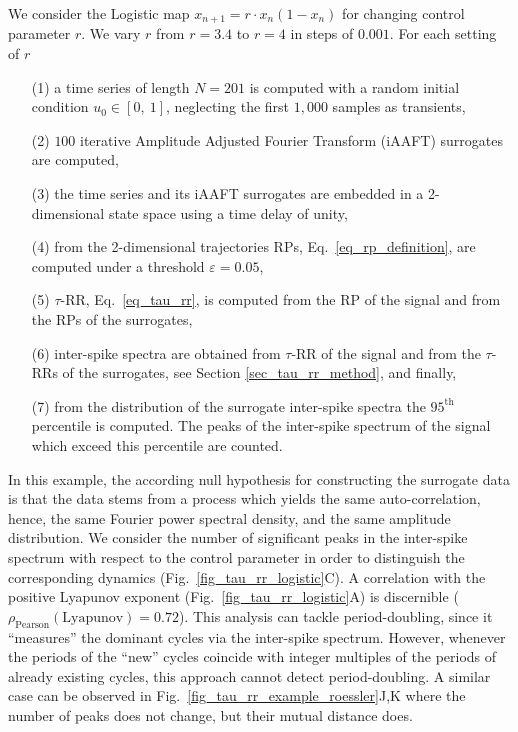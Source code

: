 \documentclass[entropy,article,submit,pdftex,moreauthors]{Definitions/mdpi}
\begin{document}
We consider the Logistic map $x_{n+1}=r\cdot x_n \left( 1-x_n \right)$ for changing control parameter $r$. We vary $r$ from $r=3.4$ to $r=4$ in steps of $0.001$. For 
each setting of $r$ 
\begin{itemize}[noitemsep]
\item[(1)] a time series of length $N=201$ is computed with a random initial condition $u_0 \in [0,\ 1]$, neglecting the first $1,000$ samples as transients,
\item[(2)] $100$ iterative Amplitude Adjusted Fourier Transform (iAAFT) surrogates \cite{Schreiber1996,Schreiber2000} are computed,
\item[(3)] the time series and its iAAFT surrogates are embedded in a 2-dimensional state space using a time delay of unity,
\item[(4)] from the 2-dimensional trajectories RPs, Eq.~\eqref{eq_rp_definition}, are computed under a threshold $\varepsilon=0.05$,
\item[(5)] $\tau$-RR, Eq.~\eqref{eq_tau_rr}, is computed from the RP of the signal and from the RPs of the surrogates,
\item[(6)] inter-spike spectra are obtained from $\tau$-RR of the signal and from the $\tau$-RRs of the surrogates, see Section \ref{sec_tau_rr_method}, and finally,
\item[(7)] from the distribution of the surrogate inter-spike spectra the $95^\text{th}$ percentile is computed. The peaks of the inter-spike spectrum of the signal which exceed 
this percentile are counted. 
\end{itemize}
In this example, the according null hypothesis for constructing the surrogate data is that the data stems from a process which yields the same auto-correlation, 
hence, the same Fourier power spectral density, and the same 
amplitude distribution. We consider the number of significant peaks in the inter-spike spectrum with
respect to the control parameter in order to distinguish the corresponding dynamics (Fig.~\ref{fig_tau_rr_logistic}C).
A correlation with the positive Lyapunov exponent (Fig.~\ref{fig_tau_rr_logistic}A) is discernible 
($\rho_{\text{Pearson}}(\text{Lyapunov})=0.72$). This analysis can tackle period-doubling, since it ``measures'' the dominant cycles via the inter-spike spectrum. 
However, whenever the periods of the ``new'' cycles coincide with integer multiples of the periods of already existing cycles, this approach cannot detect 
period-doubling. A similar case can be observed in Fig.~\ref{fig_tau_rr_example_roessler}J,K where the number of peaks does not change, but  their mutual distance does. 
\end{document}

